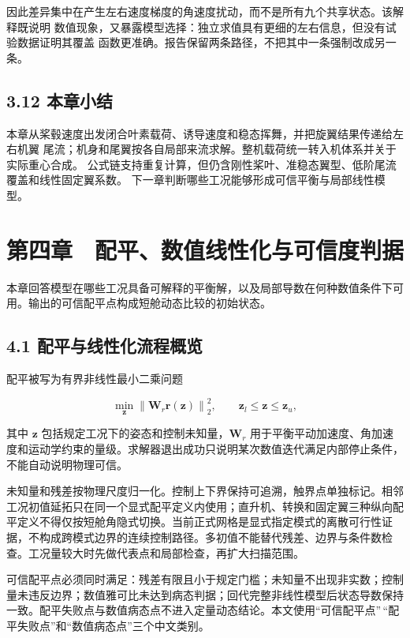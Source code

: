\documentclass[UTF8,11pt,oneside,openany,fontset=windows]{ctexbook}
\begin{document}
因此差异集中在产生左右速度梯度的角速度扰动，而不是所有九个共享状态。该解释既说明
数值现象，又暴露模型选择：独立求值具有更细的左右信息，但没有试验数据证明其覆盖
函数更准确。报告保留两条路径，不把其中一条强制改成另一条。

\section{3.12 本章小结}\label{ux672cux7ae0ux5c0fux7ed3-1}

本章从桨毂速度出发闭合叶素载荷、诱导速度和稳态挥舞，并把旋翼结果传递给左右机翼
尾流；机身和尾翼按各自局部来流求解。整机载荷统一转入机体系并关于实际重心合成。
公式链支持重复计算，但仍含刚性桨叶、准稳态翼型、低阶尾流覆盖和线性固定翼系数。
下一章判断哪些工况能够形成可信平衡与局部线性模型。

\chapter{第四章　配平、数值线性化与可信度判据}\label{ux7b2cux56dbux7ae0-ux914dux5e73ux6570ux503cux7ebfux6027ux5316ux4e0eux53efux4fe1ux5ea6ux5224ux636e}

本章回答模型在哪些工况具备可解释的平衡解，以及局部导数在何种数值条件下可用。输出的可信配平点构成短舱动态比较的初始状态。

\section{4.1
配平与线性化流程概览}\label{ux914dux5e73ux4e0eux7ebfux6027ux5316ux6d41ux7a0bux6982ux89c8}

配平被写为有界非线性最小二乘问题

\[\min_{\mathbf{z}}\left\|\mathbf{W}_r\mathbf{r}(\mathbf{z})\right\|_2^2,
\qquad \mathbf{z}_l\leq\mathbf{z}\leq\mathbf{z}_u,\]

其中 \(\mathbf{z}\) 包括规定工况下的姿态和控制未知量，\(\mathbf{W}_r\)
用于平衡平动加速度、角加速度和运动学约束的量级。求解器退出成功只说明某次数值迭代满足内部停止条件，不能自动说明物理可信。

未知量和残差按物理尺度归一化。控制上下界保持可追溯，触界点单独标记。相邻工况初值延拓只在同一个显式配平定义内使用；直升机、转换和固定翼三种纵向配平定义不得仅按短舱角隐式切换。当前正式网格是显式指定模式的离散可行性证据，不构成跨模式边界的连续控制路径。多初值不能替代残差、边界与条件数检查。工况量较大时先做代表点和局部检查，再扩大扫描范围。

可信配平点必须同时满足：残差有限且小于规定门槛；未知量不出现非实数；控制量未违反边界；数值雅可比未达到病态判据；回代完整非线性模型后状态导数保持一致。配平失败点与数值病态点不进入定量动态结论。本文使用``可信配平点''\,``配平失败点''和``数值病态点''三个中文类别。
\end{document}
